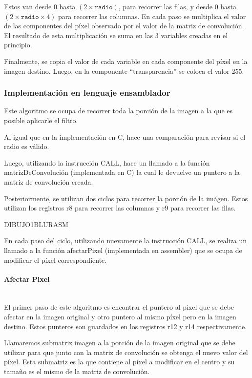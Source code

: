         Estos van desde $0$ hasta $(2 \times \mathtt{radio})$, para recorrer las filas, y desde $0$ hasta $(2 \times \mathtt{radio} \times 4)$ para recorrer las columnas. En cada paso se multiplica el valor de las componentes del píxel observado por el valor de la matriz de convolución. El resultado de esta multiplicación se suma en las 3 variables creadas en el principio. 
        
        Finalmente, se copia el valor de cada variable en cada componente del píxel en la imagen destino. Luego, en la componente “transparencia” se coloca el valor 255.  

    \subsubsection{Implementación en lenguaje ensamblador} 
      Este algoritmo se ocupa de recorrer toda la porción de la imagen a la que es posible aplicarle el filtro. 
      
      Al igual que en la implementación en C, hace una comparación para revisar si el radio es válido. 
      
      Luego, utilizando la instrucción CALL, hace un llamado a la función matrizDeConvolución (implementada en C) la cual le devuelve un puntero a la matriz de convolución creada. 
      
      Posteriormente, se utilizan dos ciclos para recorrer la porción de la imágen. Estos utilizan los registros r8 para recorrer las columnas y r9 para recorrer las filas.
  
      DIBUJO1BLURASM
      
      En cada paso del ciclo, utilizando nuevamente la instrucción CALL, se realiza un llamado a la función afectarPixel (implementada en assembler) que se ocupa de modificar el píxel correspondiente. 

      \paragraph{Afectar Pixel}\mbox{} \\
        El primer paso de este algoritmo es encontrar el puntero al píxel que se debe afectar en la imagen original y otro puntero al mismo píxel pero en la imagen destino. Estos punteros son guardados en los registros r12 y r14 respectivamente.   

        Llamaremos submatriz imagen a la porción de la imagen original que se debe utilizar para que junto con la matriz de convolución se obtenga el nuevo valor del píxel. Esta submatriz es la que contiene al píxel a modificar en el centro y su tamaño es el mismo de la matriz de convolución. 
        
